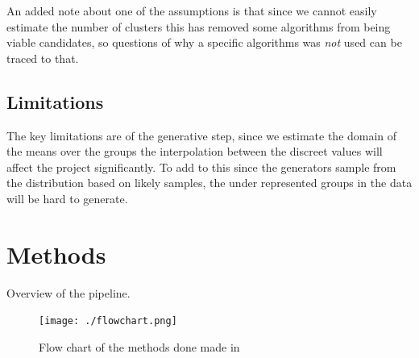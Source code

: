\documentclass[12pt, a4paper]{article}
\begin{document}
\begin{multicols}{2}
            An added note about one of the assumptions is that since we cannot easily estimate the number of clusters this has removed some algorithms from being viable candidates, so questions of why a specific algorithms was \textit{not} used can be traced to that.
            \newline


            \subsection{Limitations}\label{sub:Limitations} %

            The key limitations are of the generative step, since we estimate the domain of the means over the groups the interpolation between the discreet values will affect the project significantly. To add to this since the generators sample from the distribution based on likely samples, the under represented groups in the data will be hard to generate.
            \newline



        \section{Methods} \label{sec:Methods}

            Overview of the pipeline.
            \newline

            \end{multicols}

                \begin{figure}[H]
                    \begin{center}
                        \texttt{[image: ./flowchart.png]}
                    \end{center}
                    \caption{Flow chart of the methods done made in \cite{noauthor_excalidraw_nodate}}\label{fig:Flow}
                \end{figure}
\end{document}
